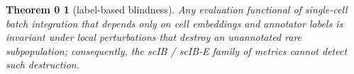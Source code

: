 %

\newtheorem*{theoremZero}{Theorem 0}
\begin{theoremZero}[label-based blindness]
\label{thm:labelblind}
Any evaluation functional of single-cell batch integration that depends only on cell embeddings and annotator labels is invariant under local perturbations that destroy an unannotated rare subpopulation; consequently, the scIB / scIB-E family of metrics cannot detect such destruction.
\end{theoremZero}
